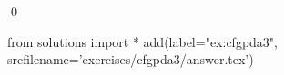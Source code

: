 
\begin{ex} 
  \label{ex:cfgpda3}
  
  \qed
\end{ex} 
\begin{python0}
from solutions import *
add(label="ex:cfgpda3",
    srcfilename='exercises/cfgpda3/answer.tex') 
\end{python0}
